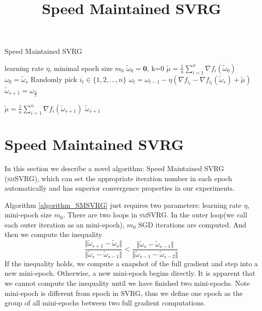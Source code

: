 \documentclass[letterpaper]{article}
\title{Speed Maintained SVRG}
\begin{document}
 
 \maketitle
 

 
 \begin{algorithm}[t]
 	\caption{Speed Maintained SVRG}
	\label{algorithm_SMSVRG}
	\begin{algorithmic}[1]
	\Require learning rate $\eta$, minimal epoch size $m_0$
	\Initial $\tilde{\omega}_0=\mathbf{0}$, k=0
	\State $\tilde{\mu} = \frac{1}{n}\sum\limits_{i=1}^{n}\nabla f_{i}(\tilde{\omega}_{0})$
		\State $\omega_0 = \tilde{\omega}_s$
			\State Randomly pick $i_t\in\{1, 2, ..., n\}$
			\State $\omega_t = \omega_{t-1} - \eta(\nabla f_{i_t} - \nabla f_{i_t}(\tilde{\omega}_s)+\tilde{\mu})$
		\EndFor
		\State $\tilde{\omega}_{s+1} = \omega_{\frac{n}{2}}$
		
		\State $\tilde{\mu} = \frac{1}{n}\sum\limits_{i=1}^{n}\nabla f_{i}(\tilde{\omega}_{s+1})$
		\EndIf	
	\EndFor
	\State \Return $\tilde{\omega}_{s+1}$
	\end{algorithmic}	
\end{algorithm}

 \section{Speed Maintained SVRG}
 In this section we describe a novel algorithm: Speed Maintained SVRG (\textsc{smSVRG}), which can set the appropriate iteration number in each epoch automatically and has superior convergence properties in our experiments. 
 
 Algorithm \ref{algorithm_SMSVRG} just requires two parameters: learning rate $\eta$, mini-epoch size $m_0$. There are two loops in \textsc{smSVRG}. In the outer loop(we call each outer iteration as an mini-epoch),  $m_0$ SGD iterations are computed. And then we compute the inequality 
 \begin{equation}
 \label{inequality_1}
 \frac{\Vert  \tilde{\omega}_{s+1} - \tilde{\omega}_{s}  \Vert} {\Vert  \tilde{\omega}_{s} - \tilde{\omega}_{s-1}  \Vert}  <\frac{\Vert \tilde{\omega}_{s} - \tilde{\omega}_{s-1}  \Vert } {\Vert  \tilde{\omega}_{s-1} - \tilde{\omega}_{s-2}  \Vert}
 \end{equation}
 If the inequality holds, we compute a snapshot of the full gradient and step into a new mini-epoch. Otherwise, a new mini-epoch begins directly. It is apparent that we cannot compute the inequality until we have finished two mini-epochs. Note mini-epoch is different from epoch in SVRG, thus we define one epoch as the group of all mini-epochs between two full gradient computations.
 
\end{document}
